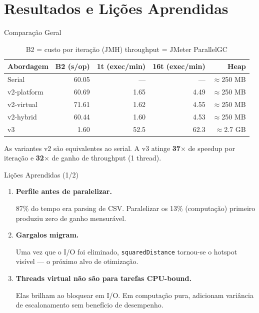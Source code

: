 \section{Resultados e Lições Aprendidas}

\begin{frame}{Comparação Geral}
    \begin{table}
        \centering
        \small
        \begin{tabular}{lrrrr}
            \toprule
            \textbf{Abordagem} & \textbf{B2 (s/op)} & \textbf{1t (exec/min)} & \textbf{16t (exec/min)} & \textbf{Heap} \\
            \midrule
            Serial      & 60.05 &    ---  &    ---  & $\approx$250 MB \\
            v2-platform & 60.69 &   1.65  &   4.49  & $\approx$250 MB \\
            v2-virtual  & 71.61 &   1.62  &   4.55  & $\approx$250 MB \\
            v2-hybrid   & 60.44 &   1.60  &   4.53  & $\approx$250 MB \\
            \rowcolor{green!15}
            v3          &  1.60 &  52.5   &  62.3   & $\approx$2.7 GB \\
            \bottomrule
        \end{tabular}
        \caption*{B2 = custo por iteração (JMH) \quad throughput = JMeter ParallelGC}
    \end{table}

    \medskip
    As variantes v2 são equivalentes ao serial. A v3 atinge \textbf{37$\times$} de
    speedup por iteração e \textbf{32$\times$} de ganho de throughput (1 thread).
\end{frame}

\begin{frame}{Lições Aprendidas (1/2)}
    \begin{enumerate}
        \item \textbf{Perfile antes de paralelizar.}

              87\% do tempo era parsing de CSV. Paralelizar os 13\%
              (computação) primeiro produziu zero de ganho mensurável.

        \bigskip
        \item \textbf{Gargalos migram.}

              Uma vez que o I/O foi eliminado, \texttt{squaredDistance} tornou-se
              o hotspot visível --- o próximo alvo de otimização.

        \bigskip
        \item \textbf{Threads virtual não são para tarefas CPU-bound.}

              Elas brilham ao bloquear em I/O. Em computação pura, adicionam
              variância de escalonamento sem benefício de desempenho.
    \end{enumerate}
\end{frame}

